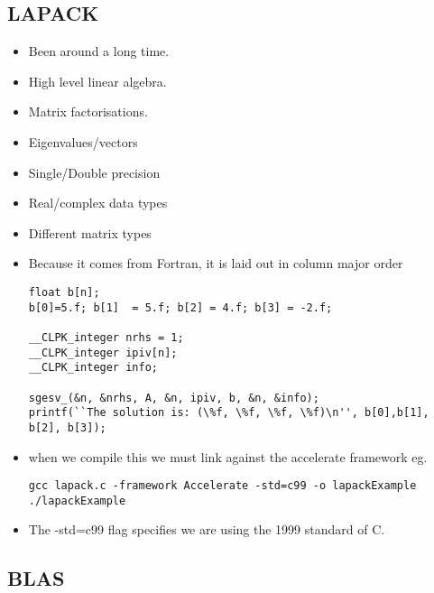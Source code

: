 \subsection{LAPACK}
\begin{itemize}
\item Been around a long time.
\item High level linear algebra.
\item Matrix factorisations.
\item Eigenvalues/vectors
\item Single/Double precision
\item Real/complex data types
\item Different matrix types
\item Because it comes from Fortran, it is laid out in column major order
\begin{verbatim}
float b[n];
b[0]=5.f; b[1]  = 5.f; b[2] = 4.f; b[3] = -2.f;

__CLPK_integer nrhs = 1;
__CLPK_integer ipiv[n];
__CLPK_integer info;

sgesv_(&n, &nrhs, A, &n, ipiv, b, &n, &info);
printf(``The solution is: (\%f, \%f, \%f, \%f)\n'', b[0],b[1], b[2], b[3]);

\end{verbatim}
\item when we compile this we must link against the accelerate framework eg.
\begin{verbatim}
gcc lapack.c -framework Accelerate -std=c99 -o lapackExample
./lapackExample
\end{verbatim}
\item The -std=c99 flag specifies we are using the 1999 standard of C.
\end{itemize}

\subsection{BLAS}

